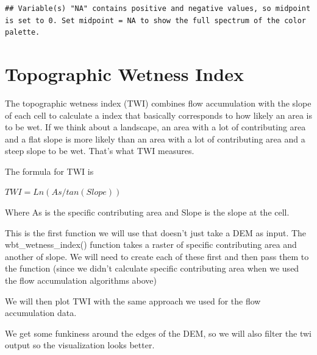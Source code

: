 \documentclass[
]{book}
\begin{document}
\begin{verbatim}
## Variable(s) "NA" contains positive and negative values, so midpoint is set to 0. Set midpoint = NA to show the full spectrum of the color palette.
\end{verbatim}

\hypertarget{topographic-wetness-index}{%
\section{Topographic Wetness Index}\label{topographic-wetness-index}}

The topographic wetness index (TWI) combines flow accumulation with the slope of each cell to calculate a index that basically corresponds to how likely an area is to be wet. If we think about a landscape, an area with a lot of contributing area and a flat slope is more likely than an area with a lot of contributing area and a steep slope to be wet. That's what TWI measures.

The formula for TWI is

\(TWI = Ln(As / tan(Slope))\)

Where As is the specific contributing area and Slope is the slope at the cell.

This is the first function we will use that doesn't just take a DEM as input. The wbt\_wetness\_index() function takes a raster of specific contributing area and another of slope. We will need to create each of these first and then pass them to the function (since we didn't calculate specific contributing area when we used the flow accumulation algorithms above)

We will then plot TWI with the same approach we used for the flow accumulation data.

We get some funkiness around the edges of the DEM, so we will also filter the twi output so the visualization looks better.
\end{document}
